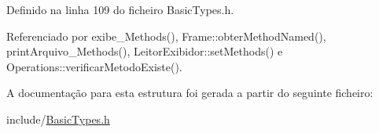 Definido na linha 109 do ficheiro Basic\+Types.\+h.



Referenciado por exibe\+\_\+\+Methods(), Frame\+::obter\+Method\+Named(), print\+Arquivo\+\_\+\+Methods(), Leitor\+Exibidor\+::set\+Methods() e Operations\+::verificar\+Metodo\+Existe().



A documentação para esta estrutura foi gerada a partir do seguinte ficheiro\+:\begin{DoxyCompactItemize}
\item 
include/\hyperlink{BasicTypes_8h}{Basic\+Types.\+h}\end{DoxyCompactItemize}

